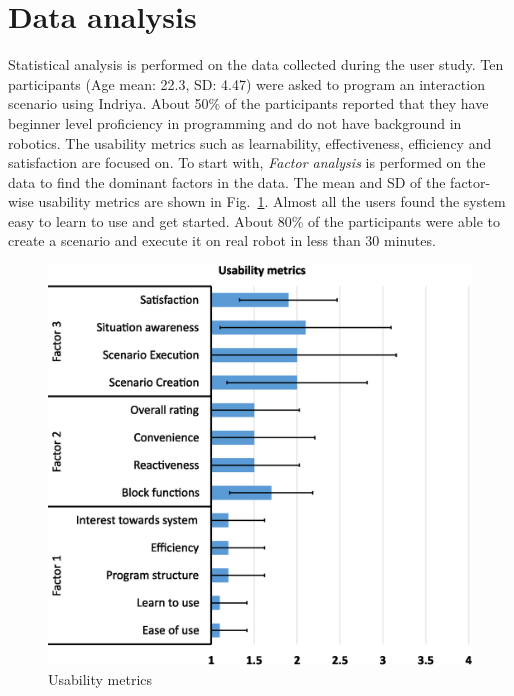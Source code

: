 \section{Data analysis}
Statistical analysis is performed on the data collected during the user study. Ten participants (Age mean: 22.3, SD: 4.47) were asked to program an interaction scenario using Indriya. About 50\% of the participants reported that they have beginner level proficiency in programming and do not have background in robotics. The usability metrics such as learnability, effectiveness, efficiency and satisfaction are focused on. To start with, \emph{Factor analysis} is performed on the data to find the dominant factors in the data. The mean and SD of the factor-wise usability metrics are shown in Fig.~\ref{fig:metrics}. Almost all the users found the system easy to learn to use and get started. About 80\% of the participants were able to create a scenario and execute it on real robot in less than 30 minutes.
 \begin{figure}
 \centering
 \includegraphics[width=\columnwidth]{../../thesis/assets/usability.eps}
 \caption[Usability metrics]{Usability metrics}
 \label{fig:metrics}
 \end{figure}

